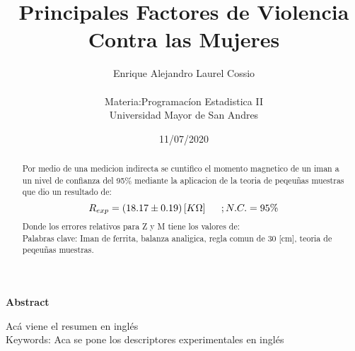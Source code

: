 \documentclass[11pt]{article}
\title{\textbf{Principales Factores de Violencia Contra las Mujeres}}
\author{Enrique Alejandro Laurel Cossio\\
\\Materia:Programacíon Estadistica II
\\Universidad Mayor de San Andres}
\date{11/07/2020}
\begin{document}
\maketitle
\begin{abstract}
\noindent Por medio de una medicion indirecta se cuntifico el momento magnetico de un iman a un nivel de confianza del 95\% mediante la aplicacion de la teoria de peqeuñas muestras que dio un resultado de: 
\[
R_{exp} = (18.17\pm 0.19)\left[ K\Omega\right] \hspace{0.5cm} ;N.C. = 95\%
\]
Donde los errores relativos para Z y M tiene los valores de:
\\
Palabras clave: Iman de ferrita, balanza analigica, regla comun de 30 [cm], teoria de peqeuñas muestras.
 \end{abstract}
\begin{center}
\textbf{Abstract}
\end{center}
\hspace{0.75cm} Acá viene el resumen en inglés \\
\indent \hspace{0.35cm}Keywords: Aca se pone los descriptores experimentales en inglés
\end{document}
